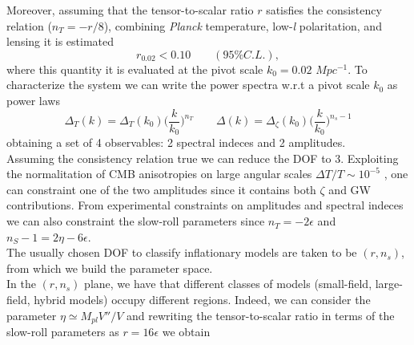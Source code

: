 \documentclass[11pt,a4paper,twoside]{book}
\begin{document}
Moreover, assuming that the tensor-to-scalar ratio $ r $ satisfies the consistency relation  ($ n_{T} = -r/8 $), combining \textit{Planck} temperature, low-\textit{l} polaritation, and lensing it is estimated
\begin{equation}
	r_{0.02} < 0.10 \qquad (95\% C.L.),
\end{equation}
where this quantity it is evaluated at the pivot scale $ k_{0}=0.02 $ $ Mpc^{-1} $.
To characterize the system we can write the power spectra w.r.t a pivot scale $ k_{0} $ as power laws
\begin{equation}
	\Delta_{T}(k) = \Delta_{T}(k_{0})\Big (\frac{k}{k_{0}}\Big)^{n_{T}} \qquad \Delta(k) = \Delta_{\zeta}(k_{0})\Big (\frac{k}{k_{0}}\Big)^{n_{s}-1}
\end{equation}
obtaining a set of 4 observables: 2 spectral indeces and 2 amplitudes.\\
Assuming the consistency relation true we can reduce the DOF to 3.  Exploiting the normalitation of CMB anisotropies on large angular scales $ \Delta T/T \sim 10^{-5}$ \cite{Chap2:Wilkinson}, one can constraint one of the two amplitudes since it contains both $\zeta$ and GW contributions.
From experimental constraints on amplitudes and spectral indeces we can also constraint  the slow-roll parameters since $ n_{T}=-2\epsilon $ and $ n_{S}-1=2\eta - 6\epsilon $.\\
The usually chosen DOF to classify inflationary models are taken to be $ (r,n_{s}) $, from which we build the parameter space.\\
In the $ (r,n_{s}) $ plane, we have that different classes of models (small-field, large-field, hybrid models) occupy different regions. Indeed, we can consider  the parameter $\eta\simeq M_{pl}V''/V$ and rewriting the tensor-to-scalar ratio in terms of the slow-roll parameters as $r=16\epsilon$ we obtain
\end{document}

